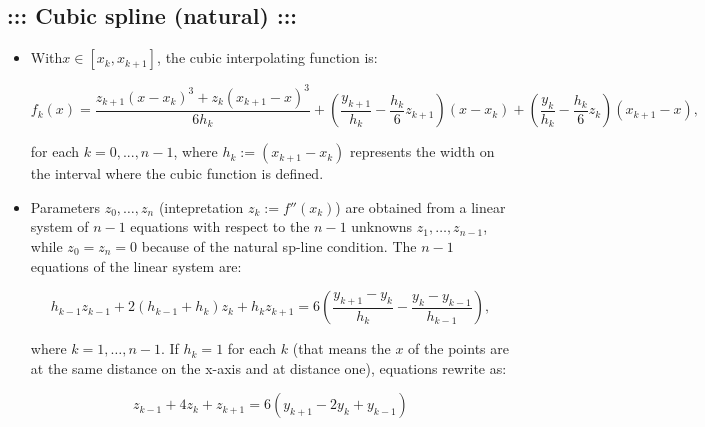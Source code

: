 \documentclass[a4paper,12pt]{amsart}
\newif\ifita
\begin{document}
\subsection*{\bf ::: \ifita Spline cubica (naturale) \else Cubic spline (natural) \fi :::} 
\begin{itemize}
\ifita
\item Per $x\in[x_k,x_{k+1}]$, ho la cubica:
\else
\item With$x\in[x_k,x_{k+1}]$, the cubic interpolating function is:
\fi
$$f_k(x)=\frac{z_{k+1}(x-x_k)^3+z_k(x_{k+1}-x)^3}{6h_k}+\left(\frac{y_{k+1}}{h_k}-\frac{h_k}{6}z_{k+1}\right)(x-x_k)+\left(\frac{y_{k}}{h_k}-\frac{h_k}{6}z_{k}\right)(x_{k+1}-x),$$
\ifita
per ogni $k=0,...,n-1$, dove $h_k:=(x_{k+1}-x_k)$ reppresenta l'ampiezza dell'intervallo su cui \`e definita la cubica.
\else
for each $k=0,...,n-1$, where $h_k:=(x_{k+1}-x_k)$ represents the width on the interval where the cubic function is defined.
\fi
\ifita
\item I parametri $z_0,\ldots,z_n$ (intepretazione $z_k:=f''(x_k)$) si ricavano mediante risoluzione di un sistema lineare di $n-1$ equazioni nelle $n-1$ incognite $z_1,\ldots,z_{n-1}$, mentre $z_0=z_n=0$ per la condizione di naturalit\`a. Le $n-1$ equazioni del sistema sono:
\else
\item Parameters $z_0,\ldots,z_n$ (intepretation $z_k:=f''(x_k)$) are obtained from a linear system of $n-1$ equations with respect to the $n-1$ unknowns $z_1,\ldots,z_{n-1}$, while $z_0=z_n=0$ because of the natural sp-line condition. The $n-1$ equations of the linear system are:
\fi
$$h_{k-1}z_{k-1}+2(h_{k-1}+h_k)z_k+h_kz_{k+1}=6\left(\frac{y_{k+1}-y_k}{h_k}-\frac{y_k-y_{k-1}}{h_{k-1}}\right),$$
\ifita con $k=1,\ldots,n-1$. Se $h_k=1$ per ogni $k$ (ovvero le $x$ dei punti sono equidistanti ed a distanza uno), le equazioni si riscrivono come:
\else
where $k=1,\ldots,n-1$. If $h_k=1$ for each $k$ (that means the $x$ of the points are at the same distance on the x-axis and at distance one), equations rewrite as:
\fi
$$z_{k-1}+4 z_k+z_{k+1}=6 (y_{k+1}-2y_k+y_{k-1})$$
\end{itemize}
\newpage
\end{document}
